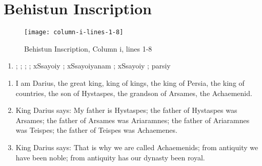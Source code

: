 \section{Behistun Inscription}

\begin{figure}[H]
    \texttt{[image: column-i-lines-1-8]}
    \caption{Behistun Inscription, Column i, lines 1-8\cite{BehistunT01}}
\end{figure}

\begin{enumerate}
    \item {\oldpersian ;} {\oldpersian ;}   {\oldpersian ;}  {\oldpersian ;} {\oldpersian xSsayoiy} {\oldpersian ;} {\oldpersian xSsayoiyanam} {\oldpersian ;} {\oldpersian xSsayoiy} {\oldpersian ;} {\oldpersian parsiy}
\end{enumerate}

\begin{enumerate}
    \item I am Darius, the great king, king of kings, the king of Persia, the king of countries, the son of Hystaspes,
         the grandson of Arsames, the Achaemenid.
    \item King Darius says: My father is Hystaspes; the father of Hystaspes was Arsames; the father of Arsames was
          Ariaramnes; the father of Ariaramnes was Teispes; the father of Teispes was Achaemenes.
    \item King Darius says: That is why we are called Achaemenids; from antiquity we have been noble; from antiquity
          has our dynasty been royal.
\end{enumerate}
